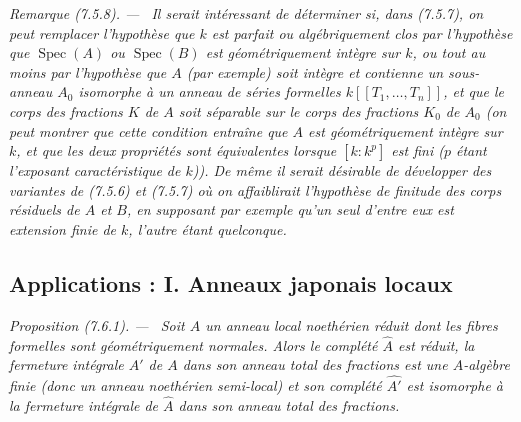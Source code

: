 \documentclass[10pt,oneside]{book}
\newenvironment{proposition}[1][]{%
  \par\medskip\noindent\itshape Proposition (#1). ---\ }{\par}
\newenvironment{remark}[1][]{%
  \par\medskip\noindent\itshape Remarque (#1). ---\ }{\par}
\begin{document}
\begin{remark}[7.5.8]
\label{IV.2.s7.5.8-fr}
Il serait intéressant de déterminer si, dans (7.5.7), on peut remplacer
l'hypothèse que $k$ est parfait ou algébriquement clos par l'hypothèse que
$\operatorname{Spec}(A)$ ou $\operatorname{Spec}(B)$ est géométriquement
intègre sur $k$, ou tout au moins par l'hypothèse que $A$ (par exemple) soit
intègre et contienne un sous-anneau $A_0$ isomorphe à un anneau de séries
formelles $k[[T_1,\ldots,T_n]]$, et que le corps des fractions $K$ de $A$ soit
séparable sur le corps des fractions $K_0$ de $A_0$ (on peut montrer que cette
condition entraîne que $A$ est géométriquement intègre sur $k$, et que les
deux propriétés sont équivalentes lorsque $[k:k^p]$ est fini ($p$ étant
l'exposant caractéristique de $k$)). De même il serait désirable de développer
des variantes de (7.5.6) et (7.5.7) où on affaiblirait l'hypothèse de finitude
des corps résiduels de $A$ et $B$, en supposant par exemple qu'un seul d'entre
eux est extension finie de $k$, l'autre étant quelconque.
\end{remark}

\subsection{Applications : I. Anneaux japonais locaux}
\label{IV.2.ss7.6-fr}

\begin{proposition}[7.6.1]
\label{IV.2.s7.6.1-fr}
Soit $A$ un anneau local noethérien réduit dont les fibres formelles sont
géométriquement normales. Alors le complété $\widehat A$ est réduit, la
fermeture intégrale $A'$ de $A$ dans son anneau total des fractions est une
$A$-algèbre finie (donc un anneau noethérien semi-local) et son complété
$\widehat{A'}$ est isomorphe à la fermeture intégrale de $\widehat A$ dans son
anneau total des fractions.
\end{proposition}
\end{document}

